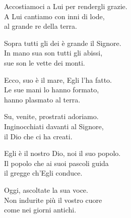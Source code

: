

\spazio

\strofa Accostiamoci a Lui per rendergli grazie.\\
A Lui cantiamo con inni di lode,\\
al grande re della terra.

\spazio


\spazio

\strofa Sopra tutti gli dei è grande il Signore.\\
In mano sua son tutti gli abissi,\\
sue son le vette dei monti.

\spazio


\spazio

\strofa Ecco, suo è il mare, Egli l'ha fatto.\\
Le sue mani lo hanno formato,\\
hanno plasmato al terra.

\spazio


\spazio

\strofa Su, venite, prostrati adoriamo.\\
Inginocchiati davanti al Signore,\\
il Dio che ci ha creati.

\spazio


\spazio

\strofa Egli è il nostro Dio, noi il suo popolo.\\
Il popolo che ai suoi pascoli guida\\
il gregge ch'Egli conduce.

\spazio


\spazio

\strofa Oggi, ascoltate la sua voce.\\
Non indurite più il vostro cuore\\
come nei giorni antichi.

\spazio

